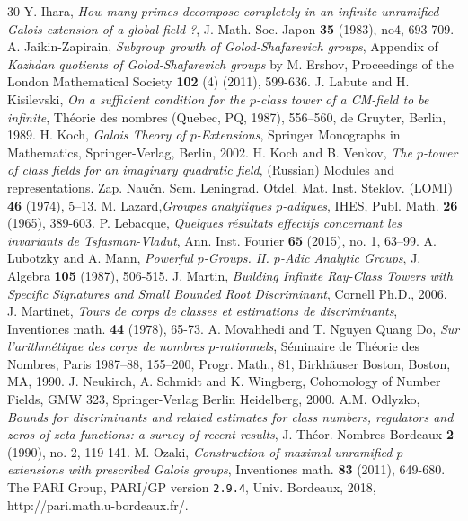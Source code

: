 \documentclass[12pt,a4paper,twoside,english]{smfart}
\begin{document}
\begin{thebibliography}{30}
 Y. Ihara, {\em How many primes decompose completely in an infinite unramified Galois extension of a global field ?}, J. Math. Soc. Japon {\bf 35} (1983), no4, 693-709.
  A. Jaikin-Zapirain, {\em Subgroup growth of Golod-Shafarevich groups}, Appendix of {\em Kazhdan quotients of Golod-Shafarevich groups} by M. Ershov, Proceedings of the London Mathematical Society  {\bf 102} (4) (2011), 599-636.
  J. Labute and H. Kisilevski, {\em On a sufficient condition for the $p$-class tower of a CM-field to be infinite}, Th\'eorie des nombres (Quebec, PQ, 1987), 556–560, de Gruyter, Berlin, 1989.
 H. Koch, {\em Galois Theory of $p$-Extensions}, Springer Monographs in Mathematics, Springer-Verlag, Berlin, 2002.
  H. Koch and B. Venkov, {\em The $p$-tower of class fields for an imaginary quadratic field}, (Russian) Modules and representations. Zap. Naučn. Sem. Leningrad. Otdel. Mat. Inst. Steklov. (LOMI) {\bf 46} (1974), 5–13.
 M. Lazard,{\em Groupes analytiques $p$-adiques}, IHES, Publ. Math. {\bf 26} (1965), 389-603.
P. Lebacque, {\em Quelques r\'esultats effectifs concernant les invariants de Tsfasman-Vladut}, Ann. Inst. Fourier {\bf 65} (2015), no. 1, 63–99.
 A. Lubotzky and A. Mann, {\em Powerful $p$-Groups. II. $p$-Adic Analytic Groups}, J. Algebra {\bf 105} (1987), 506-515.
J. Martin, {\em Building Infinite Ray-Class Towers with Specific Signatures and Small Bounded Root Discriminant}, Cornell Ph.D., 2006.
 J. Martinet, {\em Tours de corps de classes et estimations de discriminants}, Inventiones math. {\bf 44} (1978), 65-73. 
 A. Movahhedi and T. Nguyen Quang Do,
{\em Sur l’arithmétique des corps de nombres
$p$-rationnels}, Séminaire de Théorie des Nombres, Paris 1987–88, 155–200, Progr. Math., 81, Birkhäuser Boston, Boston, MA, 1990.
 J. Neukirch, A. Schmidt and K. Wingberg, Cohomology of Number Fields, GMW 323, Springer-Verlag Berlin Heidelberg,  2000.
  A.M. Odlyzko, {\em Bounds for discriminants and related estimates for class numbers, regulators and zeros of zeta functions:
 a survey of recent results}, J. Théor. Nombres Bordeaux {\bf 2} (1990), no. 2, 119-141.
 M. Ozaki, {\em Construction of maximal unramified $p$-extensions with prescribed Galois groups},  Inventiones math. {\bf 83} (2011), 649-680.  
 The PARI Group, PARI/GP version {\tt 2.9.4}, Univ. Bordeaux, 2018, http://pari.math.u-bordeaux.fr/.


\end{thebibliography}
\end{document}
